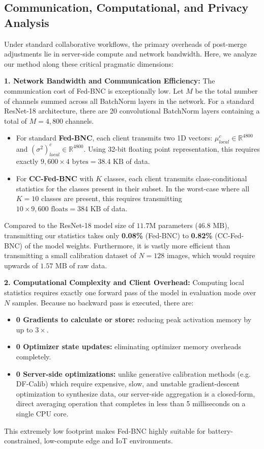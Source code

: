 \documentclass{article}
\theoremstyle{plain}
\theoremstyle{definition}
\theoremstyle{remark}
\begin{document}
\subsection{Communication, Computational, and Privacy Analysis}
\label{subsec:analysis}
Under standard collaborative workflows, the primary overheads of post-merge adjustments lie in server-side compute and network bandwidth. Here, we analyze our method along these critical pragmatic dimensions:

\textbf{1. Network Bandwidth and Communication Efficiency:}
The communication cost of Fed-BNC is exceptionally low. Let $M$ be the total number of channels summed across all BatchNorm layers in the network. For a standard ResNet-18 architecture, there are 20 convolutional BatchNorm layers containing a total of $M = 4,800$ channels. 
\begin{itemize}
    \item For standard \textbf{Fed-BNC}, each client transmits two 1D vectors: $\mu_{local}^c \in \mathbb{R}^{4800}$ and $(\sigma^2)_{local}^c \in \mathbb{R}^{4800}$. Using 32-bit floating point representation, this requires exactly $9,600 \times 4 \text{ bytes} = 38.4 \text{ KB}$ of data.
    \item For \textbf{CC-Fed-BNC} with $K$ classes, each client transmits class-conditional statistics for the classes present in their subset. In the worst-case where all $K=10$ classes are present, this requires transmitting $10 \times 9,600 \text{ floats} = 384 \text{ KB}$ of data.
\end{itemize}
Compared to the ResNet-18 model size of $11.7\text{M}$ parameters ($46.8 \text{ MB}$), transmitting our statistics takes only \textbf{0.08\%} (Fed-BNC) to \textbf{0.82\%} (CC-Fed-BNC) of the model weights. Furthermore, it is vastly more efficient than transmitting a small calibration dataset of $N=128$ images, which would require upwards of $1.57 \text{ MB}$ of raw data.

\textbf{2. Computational Complexity and Client Overhead:}
Computing local statistics requires exactly one forward pass of the model in evaluation mode over $N$ samples. Because no backward pass is executed, there are:
\begin{itemize}
    \item \textbf{0 Gradients to calculate or store:} reducing peak activation memory by up to $3\times$.
    \item \textbf{0 Optimizer state updates:} eliminating optimizer memory overheads completely.
    \item \textbf{0 Server-side optimizations:} unlike generative calibration methods (e.g. DF-Calib) which require expensive, slow, and unstable gradient-descent optimization to synthesize data, our server-side aggregation is a closed-form, direct averaging operation that completes in less than 5 milliseconds on a single CPU core.
\end{itemize}
This extremely low footprint makes Fed-BNC highly suitable for battery-constrained, low-compute edge and IoT environments.
\end{document}
